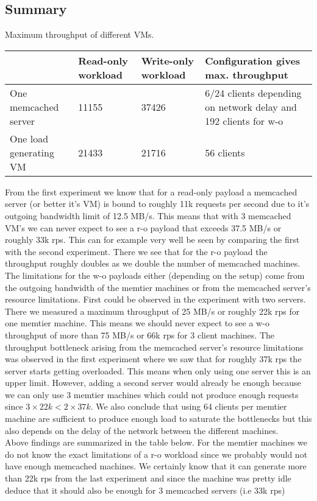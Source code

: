 \documentclass[11pt,a4paper]{article}
\begin{document}
\subsection{Summary}\label{sub:bl_without_summary}

\begin{center}
	{Maximum throughput of different VMs.}
	\begin{tabular}{|l|p{2cm}|p{2cm}|p{4cm}|}
		\hline                        & Read-only workload & Write-only workload & Configuration gives max. throughput \\ 
		\hline One memcached server   &        11155         &         37426            &      6/24 clients depending on  network delay and 192 clients for w-o                         \\ 
		\hline One load generating VM &        21433            &         21716     &              56 clients                       \\ 
		\hline 
	\end{tabular}
\end{center}

From the first experiment we know that for a read-only payload a memcached server (or better it's VM) is bound to roughly 11k requests per second due to it's outgoing bandwidth limit of 12.5 MB/s. This means that with 3 memcached VM's we can never expect to see a r-o payload that exceeds 37.5 MB/s or roughly 33k rps. This can for example very well be seen by comparing the first with the second experiment. There we see that for the r-o payload the throughput roughly doubles as we double the number of memcached machines. The limitations for the w-o payloads either (depending on the setup) come from the outgoing bandwidth of the memtier machines or from the memcached server's resource limitations. First could be observed in the experiment with two servers. There we measured a maximum throughput of 25 MB/s or roughly 22k rps for one memtier machine. This means we should never expect to see a w-o throughput of more than 75 MB/s or 66k rps for 3 client machines. The throughput bottleneck arising from the memcached server's resource limitations was observed in the first experiment where we saw that for roughly 37k rps the server starts getting overloaded. This means when only using one server this is an upper limit. However, adding a second server would already be enough because we can only use 3 memtier machines which could not produce enough requests since $3\times22k < 2\times37k$. We also conclude that using 64 clients per memtier machine are sufficient to produce enough load to saturate the bottlenecks  but this also depends on the delay of the network between the different machines.\\
Above findings are summarized in the table below. For the memtier machines we do not know the exact limitations of a r-o workload since we probably would not have enough memcached machines. We certainly know that it can generate more than 22k rps from the last experiment and since the machine was pretty idle deduce that it should also be enough for 3 memcached servers (i.e 33k rps) \\
\end{document}
